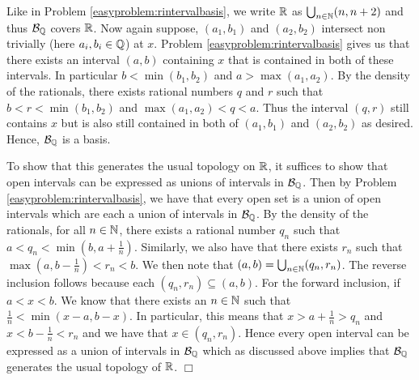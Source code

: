 \documentclass{article}
\begin{document}
 {
    Like in Problem \ref{easyproblem:rintervalbasis}, we write $\mathbb{R}$ as $\bigcup_{n\in\mathbb{N}}(n, n+2)$ and thus $\mathcal{B}_{\mathbb{Q}}$ covers $\mathbb{R}$. Now again suppose, $(a_{1}, b_{1})$ and $(a_{2}, b_{2})$ intersect non trivially (here $a_{i}, b_{i}\in \mathbb{Q}$) at $x$. Problem \ref{easyproblem:rintervalbasis} gives us that there exists an interval $(a,b)$ containing $x$ that is contained in both of these intervals. In particular $b < \min(b_{1}, b_{2})$ and $a > \max(a_{1}, a_{2})$. By the density of the rationals, there exists rational numbers $q$ and $r$ such that $b < r< \min(b_{1}, b_{2})$ and $\max(a_{1}, a_{2}) < q < a$. Thus the interval $(q,r)$ still contains $x$ but is also still contained in both of $(a_{1}, b_{1})$ and $(a_{2}, b_{2})$ as desired. Hence, $\mathcal{B}_{\mathbb{Q}}$ is a basis.
    
    To show that this generates the usual topology on $\mathbb{R}$, it suffices to show that open intervals can be expressed as unions of intervals in $\mathcal{B}_{\mathbb{Q}}$. Then by Problem \ref{easyproblem:rintervalbasis}, we have that every open set is a union of open intervals which are each a union of intervals in $\mathcal{B}_{\mathbb{Q}}$. By the density of the rationals, for all $n\in \mathbb{N}$, there exists a rational number $q_{n}$ such that $a < q_{n} < \min(b, a + \frac{1}{n})$. Similarly, we also have that there exists $r_{n}$ such that $\max(a, b - \frac{1}{n}) < r_{n} < b$. We then note that $(a,b) = \bigcup_{n\in\mathbb{N}} (q_{n}, r_{n})$. The reverse inclusion follows because each $(q_{n}, r_{n})\subseteq (a,b)$. For the forward inclusion, if $a < x < b$. We know that there exists an $n\in \mathbb{N}$ such that $\frac{1}{n} < \min(x-a, b-x)$. In particular, this means that $x > a + \frac{1}{n} > q_{n}$ and $x < b- \frac{1}{n} < r_{n}$ and we have that $x\in (q_{n}, r_{n})$. Hence every open interval can be expressed as a union of intervals in $\mathcal{B}_{\mathbb{Q}}$ which as discussed above implies that $\mathcal{B}_{\mathbb{Q}}$ generates the usual topology of $\mathbb{R}$. $\Box$
}
\end{document}
